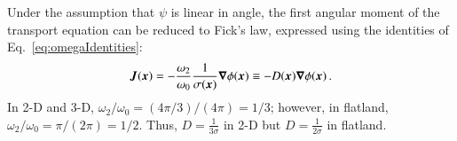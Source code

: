 \documentclass{anstrans}
\begin{document}
%
Under the assumption that $\psi$ is linear in angle, the first angular moment
of the transport equation can be reduced to Fick's law, expressed using the
identities of Eq.~\eqref{eq:omegaIdentities}:
\begin{equation} \label{eq:fickGeneral}
  \bm{J}(\bm{x})
  = - \frac{\omega_2}{\omega_0} \frac{1}{\sigma(\bm{x})} \bm{\nabla} \phi(\bm{x})
  \equiv -D(\bm{x}) \bm{\nabla} \phi(\bm{x})\,.
\end{equation}
In 2-D and 3-D, $\omega_2/\omega_0 = (4\pi / 3) / (4\pi) = 1/3$; however, in
flatland, $\omega_2/\omega_0 = \pi / (2\pi) = 1/2$. Thus, $D=\frac{1}{3\sigma}$ in
2-D but $D=\frac{1}{2\sigma}$ in flatland.
\end{document}
